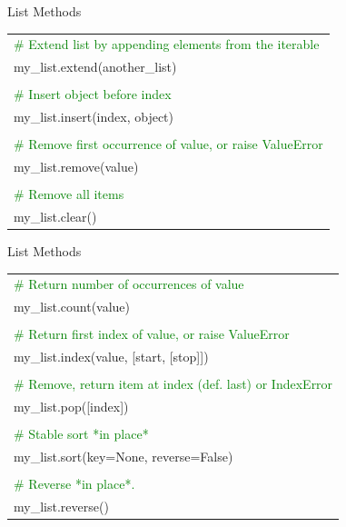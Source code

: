 \documentclass[serif, aspectratio=169]{beamer}
\newcommand{\tgreen}[1]{\textcolor{green}{#1}}
\newenvironment{CLI} %
    {
    \noindent
    \ttfamily 
    \footnotesize
    \begin{tcolorbox}[colback=gray!150,colframe=black]
    \color{white}
    \begin{tabular}{p{4.5cm}p{7.5cm}}
    }
    { 
    \end{tabular}
    \end{tcolorbox}
    }
\begin{document}
\begin{frame}{List Methods}
    \begin{CLI}
        \multicolumn{2}{l}{\tgreen{\# Extend list by appending elements from the iterable}} \\
        my\_list.extend(another\_list) & \\
         & \\
        \multicolumn{2}{l}{\tgreen{\# Insert object before index}} \\
        \multicolumn{2}{l}{my\_list.insert(index, object)} \\
         & \\
        \multicolumn{2}{l}{\tgreen{\# Remove first occurrence of value, or raise ValueError}} \\
        my\_list.remove(value) & \\
         & \\
        \multicolumn{2}{l}{\tgreen{\# Remove all items}} \\
        my\_list.clear() & \\
    \end{CLI}
\end{frame}


\begin{frame}{List Methods}
    \begin{CLI}
        \multicolumn{2}{l}{\tgreen{\# Return number of occurrences of value}} \\
        my\_list.count(value) & \\
        & \\
        \multicolumn{2}{l}{\tgreen{\# Return first index of value, or raise ValueError}} \\
        \multicolumn{2}{l}{my\_list.index(value, [start, [stop]])} \\
        & \\
        \multicolumn{2}{l}{\tgreen{\# Remove, return item at index (def. last) or IndexError}} \\
        my\_list.pop([index]) & \\
        & \\
        \multicolumn{2}{l}{\tgreen{\# Stable sort *in place*}} \\
        \multicolumn{2}{l}{my\_list.sort(key=None, reverse=False)} \\
        & \\
        \multicolumn{2}{l}{\tgreen{\# Reverse *in place*.}} \\
        my\_list.reverse() & \\
    \end{CLI}
\end{frame}
\end{document}
